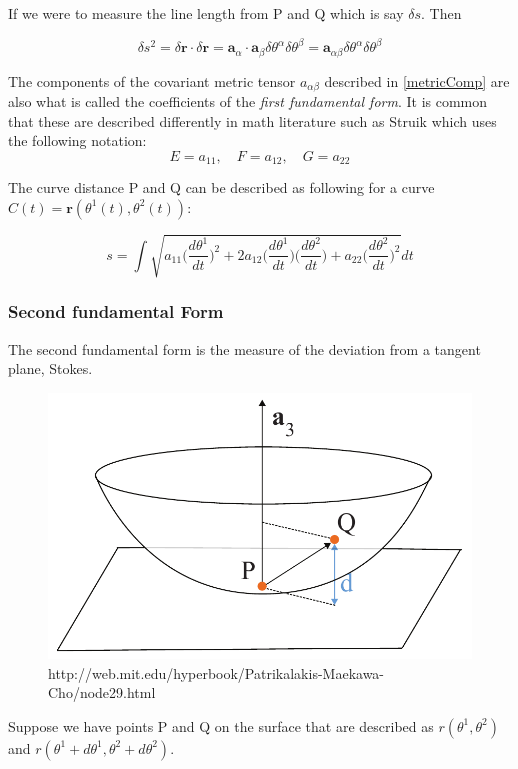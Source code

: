 If we were to measure the line length from P and Q which is say $\delta s$. Then 

\begin{equation}
\delta s^2 = \delta \textbf{r} \cdot \delta \textbf{r} =  \textbf{a}_\alpha \cdot \textbf{a}_\beta \delta\theta^\alpha \delta\theta^\beta =  \textbf{a}_{\alpha\beta} \delta\theta^\alpha \delta\theta^\beta 
\end{equation}

The components of the covariant metric tensor $a_{\alpha \beta}$ described in \ref{metricComp} are also what is called the coefficients of the \textit{first fundamental form}.
It is common that these are described differently in math literature such as Struik which uses the following notation:
$$ E= a_{11} ,\quad  F = a_{12},\quad
 G = a_{22}$$

The curve distance P and Q can be described as following for a curve $ \textit{C}(t) = \textbf{r}(\theta^1(t),\theta^2(t))$:

$$s = \int { \sqrt { a_{11} \Big(\frac{d\theta^1 }{dt}\Big)^2+2a_{12}\Big(\frac{d\theta^1 }{dt}\Big)\Big(\frac{d\theta^2 }{dt}\Big)  +a_{22} \Big(\frac{d\theta^2 }{dt}\Big)^2 }  } dt$$



\subsubsection{Second fundamental Form}

The second fundamental form is the measure of the deviation from a tangent plane, Stokes.

\begin{figure}[H]
\centering
\includegraphics[width = 0.7\linewidth ]{figure/Theory/SecondFFil.pdf}
\caption{http://web.mit.edu/hyperbook/Patrikalakis-Maekawa-Cho/node29.html}
\end{figure}

Suppose we have points P and Q on the surface that are described as $r(\theta^1, \theta^2)$ and $r(\theta^1 + d\theta^1, \theta^2 + d\theta^2)$.

